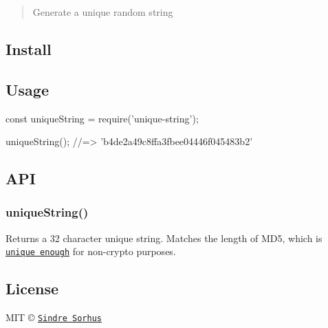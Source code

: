 \begin{quote}
Generate a unique random string \end{quote}


\subsection*{Install}




\subsection*{Usage}


\begin{DoxyCode}
const uniqueString = require('unique-string');

uniqueString();
//=> 'b4de2a49c8ffa3fbee04446f045483b2'
\end{DoxyCode}


\subsection*{A\+PI}

\subsubsection*{unique\+String()}

Returns a 32 character unique string. Matches the length of M\+D5, which is \href{http://stackoverflow.com/a/2444336/64949}{\tt unique enough} for non-\/crypto purposes.

\subsection*{License}

M\+IT © \href{https://sindresorhus.com}{\tt Sindre Sorhus} 